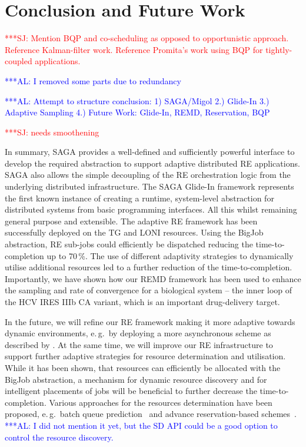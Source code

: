 \documentclass{rspublic}
\newcommand{\alnote}[1]{ {\textcolor{blue} { ***AL: #1 }}}
\newcommand{\jhanote}[1]{ {\textcolor{red} { ***SJ: #1 }}}
\newcommand{\alnote}[1]{}
\newcommand{\jhanote}[1]{}
\newcommand{\glidein}[1]{Glide-In }
\begin{document}
\section{Conclusion and Future Work}

\jhanote{Mention BQP and co-scheduling as opposed to opportunistic
  approach. Reference Kalman-filter work. Reference Promita's work
  using BQP for tightly-coupled applications.} 
                
\alnote{I removed some parts due to redundancy}

\alnote{Attempt to structure conclusion: 1) SAGA/Migol 2.) Glide-In
  3.) Adaptive Sampling 4.) Future Work: Glide-In, REMD, Reservation,
  BQP}
                                         
\jhanote{needs smoothening} 

In summary, SAGA provides a well-defined and sufficiently powerful
interface to develop the required abstraction to support adaptive
distributed RE applications.  SAGA also allows the simple decoupling
of the RE orchestration logic from the underlying distributed
infrastructure. The SAGA \glidein\ framework represents the first
known instance of creating a runtime, system-level abstraction for
distributed systems from basic programming interfaces. All this whilst
remaining general purpose and extensible.  The adaptive RE framework
has been successfully deployed on the TG and LONI resources.  Using
the BigJob abstraction, RE sub-jobs could efficiently be dispatched
reducing the time-to-completion up to 70\,\%. The use of different
adaptivity strategies to dynamically utilise additional resources led
to a further reduction of the time-to-completion.  Importantly, we
have shown how our REMD framework has been used to enhance the
sampling and rate of convergence for a biological system -- the inner
loop of the HCV IRES IIIb CA variant, which is an important
drug-delivery target.

In the future, we will refine our RE framework making it
more adaptive towards dynamic environments, e.\,g.\ by deploying  
a more asynchronous scheme as described by \citet{Gallicchio:2007yq}.
At the same time, we will improve our RE infrastructure to support
further adaptive strategies for resource determination and
utilisation.  While it has been shown, that resources can efficiently
be allocated with the BigJob abstraction, a mechanism for dynamic
resource discovery and for intelligent placements of jobs will be
beneficial to further decrease the time-to-completion.  Various
approaches for the resources determination have been proposed, e.\,g.\
batch queue prediction~\citep{1254939,Chakraborty:2008nx} and advance
reservation-based schemes~\citep{Jeske:2007wj}.  \alnote{I did not
  mention it yet, but the SD API could be a good option to control the
  resource discovery.}
\end{document}
